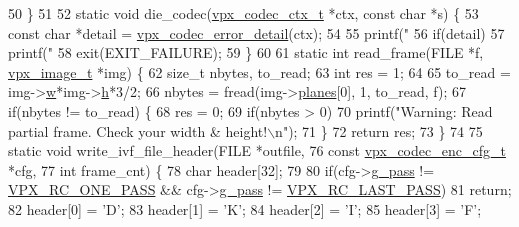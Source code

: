 \begin{DoxyCodeInclude}
50 \}
51 
52 \textcolor{keyword}{static} \textcolor{keywordtype}{void} die\_codec(\hyperlink{structvpx__codec__ctx}{vpx\_codec\_ctx\_t} *ctx, \textcolor{keyword}{const} \textcolor{keywordtype}{char} *s) \{
53     \textcolor{keyword}{const} \textcolor{keywordtype}{char} *detail = \hyperlink{group__codec_ga29273cb552ed1a437fe263c4a0a54300}{vpx\_codec\_error\_detail}(ctx);
54 
55     printf(\textcolor{stringliteral}{"%
56     \textcolor{keywordflow}{if}(detail)
57         printf(\textcolor{stringliteral}{"    %
58     exit(EXIT\_FAILURE);
59 \}
60 
61 \textcolor{keyword}{static} \textcolor{keywordtype}{int} read\_frame(FILE *f, \hyperlink{structvpx__image}{vpx\_image\_t} *img) \{
62     \textcolor{keywordtype}{size\_t} nbytes, to\_read;
63     \textcolor{keywordtype}{int}    res = 1;
64 
65     to\_read = img->\hyperlink{structvpx__image_ac7b7d569142f878155b28141653adcd6}{w}*img->\hyperlink{structvpx__image_a9d1070804dfe08cd5becd68d597fee69}{h}*3/2;
66     nbytes = fread(img->\hyperlink{structvpx__image_ab6258308ba7a5f4a113348120e20e2ce}{planes}[0], 1, to\_read, f);
67     \textcolor{keywordflow}{if}(nbytes != to\_read) \{
68         res = 0;
69         \textcolor{keywordflow}{if}(nbytes > 0)
70             printf(\textcolor{stringliteral}{"Warning: Read partial frame. Check your width & height!\(\backslash\)n"});
71     \}
72     \textcolor{keywordflow}{return} res;
73 \}
74 
75 \textcolor{keyword}{static} \textcolor{keywordtype}{void} write\_ivf\_file\_header(FILE *outfile,
76                                   \textcolor{keyword}{const} \hyperlink{structvpx__codec__enc__cfg}{vpx\_codec\_enc\_cfg\_t} *cfg,
77                                   \textcolor{keywordtype}{int} frame\_cnt) \{
78     \textcolor{keywordtype}{char} header[32];
79 
80     \textcolor{keywordflow}{if}(cfg->\hyperlink{structvpx__codec__enc__cfg_a70d62d87aae7d1168746577f14a6dccf}{g\_pass} != \hyperlink{group__encoder_gga476c5417f9c15a1dc5d3f68fa44c493fa7b6943a41868e8e26a77e9500f139ca1}{VPX\_RC\_ONE\_PASS} && cfg->\hyperlink{structvpx__codec__enc__cfg_a70d62d87aae7d1168746577f14a6dccf}{g\_pass} != 
      \hyperlink{group__encoder_gga476c5417f9c15a1dc5d3f68fa44c493fa65da543b956d6a9b1f301ab8cc90d3a7}{VPX\_RC\_LAST\_PASS})
81         \textcolor{keywordflow}{return};
82     header[0] = \textcolor{charliteral}{'D'};
83     header[1] = \textcolor{charliteral}{'K'};
84     header[2] = \textcolor{charliteral}{'I'};
85     header[3] = \textcolor{charliteral}{'F'};
}}
\end{DoxyCodeInclude}
